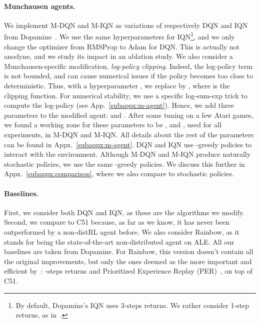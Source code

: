 \documentclass{article}
\begin{document}
\paragraph{Munchausen agents.}
We implement M-DQN and M-IQN as variations of  respectively DQN and IQN from Dopamine~\cite{castro2018dopamine}. We use the same hyperparameters for IQN\footnote{By default, Dopamine's IQN uses 3-steps returns. We rather consider 1-step returns, as in~\cite{dabney2018implicit}.}, and we only change the optimizer from RMSProp to Adam for DQN. This is actually not anodyne, and we study its impact in an ablation study.
We also consider a Munchausen-specific modification, \emph{log-policy clipping}. Indeed, the log-policy term is not bounded, and can cause numerical issues if the policy becomes too close to deterministic. Thus, with a hyperparameter , we replace  by , where  is the clipping function. For numerical stability, we use a specific log-sum-exp trick to compute the log-policy (see App.~\ref{subappx:m-agent}). Hence, we add three parameters to the modified agent:  and . After some tuning on a few Atari games, we found a working zone for these parameters to be ,  and , used for all experiments, in M-DQN and M-IQN.
All details about the rest of the parameters can be found in  Appx.~\ref{subappx:m-agent}. DQN and IQN use -greedy policies to interact with the environment. Although M-DQN and M-IQN produce naturally stochastic policies, we use the same -greedy policies.
We discuss this further in Appx.~\ref{subappx:comparison}, where we also compare to stochastic policies.


\paragraph{Baselines.}
First, we consider both DQN and IQN, as these are the algorithms we modify. Second, we compare to C51 because, as far as we know, it has never been outperformed by a non-distRL agent before. We also consider Rainbow, as it stands for being the state-of-the-art non-distributed agent on ALE. All our baselines are taken from Dopamine. For Rainbow, this version doesn't contain all the original improvements, but only the ones deemed as the more important and efficient by~\citet{hessel2018rainbow}: -steps returns and Prioritized Experience Replay (PER)~\citep{schaul2015prioritized}, on top of C51.
\end{document}
